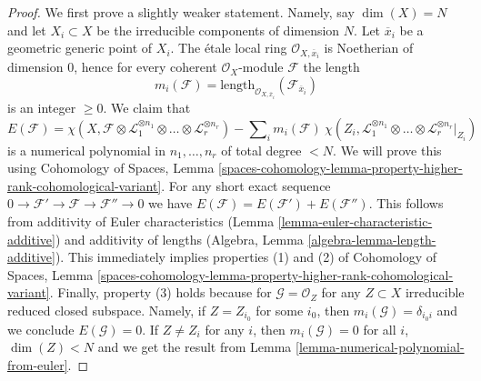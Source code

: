 \begin{proof}
We first prove a slightly weaker statement. Namely, say
$\dim(X) = N$ and let $X_i \subset X$ be the irreducible
components of dimension $N$. Let $\overline{x}_i$ be a geometric
generic point of $X_i$. The \'etale local ring
$\mathcal{O}_{X, \overline{x}_i}$ is Noetherian of
dimension $0$, hence for every coherent $\mathcal{O}_X$-module
$\mathcal{F}$ the length
$$
m_i(\mathcal{F}) = \text{length}_{\mathcal{O}_{X, \overline{x}_i}}
(\mathcal{F}_{\overline{x}_i})
$$
is an integer $\geq 0$. We claim that
$$
E(\mathcal{F}) =
\chi(X, \mathcal{F} \otimes \mathcal{L}_1^{\otimes n_1} \otimes \ldots \otimes
\mathcal{L}_r^{\otimes n_r}) -
\sum\nolimits_i
m_i(\mathcal{F})\ \chi(Z_i, \mathcal{L}_1^{\otimes n_1} \otimes \ldots \otimes
\mathcal{L}_r^{\otimes n_r}|_{Z_i})
$$
is a numerical polynomial in $n_1, \ldots, n_r$ of total degree $< N$.
We will prove this using Cohomology of Spaces, Lemma
\ref{spaces-cohomology-lemma-property-higher-rank-cohomological-variant}.
For any short exact sequence $0 \to \mathcal{F}' \to \mathcal{F} \to
\mathcal{F}'' \to 0$ we have
$E(\mathcal{F}) = E(\mathcal{F}') + E(\mathcal{F}'')$.
This follows from additivity of Euler characteristics
(Lemma \ref{lemma-euler-characteristic-additive})
and additivity of lengths
(Algebra, Lemma \ref{algebra-lemma-length-additive}).
This immediately implies properties (1) and (2) of Cohomology of Spaces, Lemma
\ref{spaces-cohomology-lemma-property-higher-rank-cohomological-variant}.
Finally, property (3) holds because for $\mathcal{G} = \mathcal{O}_Z$
for any $Z \subset X$ irreducible reduced closed subspace.
Namely, if $Z = Z_{i_0}$ for some $i_0$, then
$m_i(\mathcal{G}) = \delta_{i_0i}$ and we conclude $E(\mathcal{G}) = 0$.
If $Z \not = Z_i$ for any $i$, then $m_i(\mathcal{G}) = 0$ for all $i$,
$\dim(Z) < N$ and we get the result from
Lemma \ref{lemma-numerical-polynomial-from-euler}.


\end{proof}
